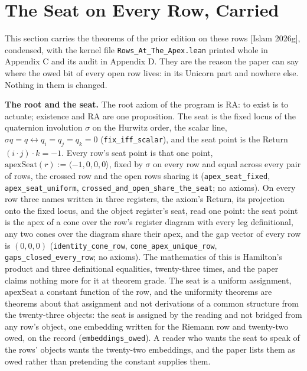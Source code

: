 \documentclass[10pt]{article}
\begin{document}
\hypertarget{the-seat-on-every-row-carried}{%
\section{The Seat on Every Row,
Carried}\label{the-seat-on-every-row-carried}}

This section carries the theorems of the prior edition on these rows
{[}Islam 2026g{]}, condensed, with the kernel file
\texttt{Rows\_At\_The\_Apex.lean} printed whole in Appendix C and its
audit in Appendix D. They are the reason the paper can say where the
owed bit of every open row lives: in its Unicorn part and nowhere else.
Nothing in them is changed.

\textbf{The root and the seat.} The root axiom of the program is
\(\mathrm{RA}\): to exist is to actuate; existence and \(\mathrm{RA}\)
are one proposition. The seat is the fixed locus of the quaternion
involution \(\sigma\) on the Hurwitz order, the scalar line,
\(\sigma q = q \leftrightarrow q_i = q_j = q_k = 0\)
(\texttt{fix\_iff\_scalar}), and the seat point is the Return
\((i \cdot j)\cdot k = -1\). Every row's seat point is that one point,
\(\mathrm{apexSeat}(r) := \langle -1, 0, 0, 0\rangle\), fixed by
\(\sigma\) on every row and equal across every pair of rows, the crossed
row and the open rows sharing it (\texttt{apex\_seat\_fixed},
\texttt{apex\_seat\_uniform},
\texttt{crossed\_and\_open\_share\_the\_seat}; no axioms). On every row
three names written in three registers, the axiom's Return, its
projection onto the fixed locus, and the object register's seat, read
one point: the seat point is the apex of a cone over the row's register
diagram with every leg definitional, any two cones over the diagram
share their apex, and the gap vector of every row is \((0, 0, 0)\)
(\texttt{identity\_cone\_row}, \texttt{cone\_apex\_unique\_row},
\texttt{gaps\_closed\_every\_row}; no axioms). The mathematics of this
is Hamilton's product and three definitional equalities, twenty-three
times, and the paper claims nothing more for it at theorem grade. The
seat is a uniform assignment, \(\mathrm{apexSeat}\) a constant function
of the row, and the uniformity theorems are theorems about that
assignment and not derivations of a common structure from the
twenty-three objects: the seat is assigned by the reading and not
bridged from any row's object, one embedding written for the Riemann row
and twenty-two owed, on the record (\texttt{embeddings\_owed}). A reader
who wants the seat to speak of the rows' objects wants the twenty-two
embeddings, and the paper lists them as owed rather than pretending the
constant supplies them.
\end{document}
